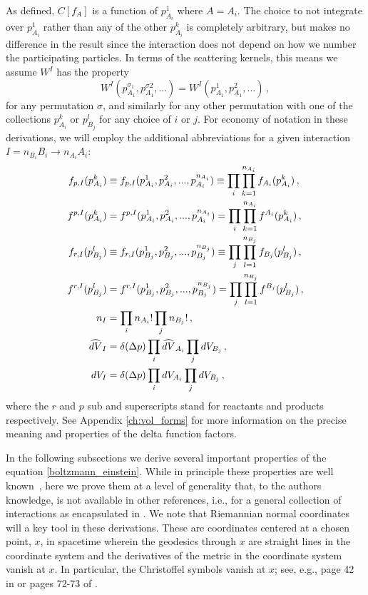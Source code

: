  As defined, $C[f_A]$ is a function of $p_{A_i}^1$ where $A=A_i$. The choice to not integrate over $p_{A_i}^1$ rather than any of the other $p_{A_i}^k$ is completely arbitrary, but makes no difference in the result since the interaction does not depend on how we number the participating particles. In terms of the scattering kernels, this means we assume $W^I$ has the property
\begin{equation}\label{reorder_property}
W^I(p_{A_1}^{\sigma_1},p^{\sigma 2}_{A_1},...)=W^I(p_{A_1}^1,p_{A_1}^2,...)\,,
\end{equation}
for any permutation $\sigma$, and similarly for any other permutation with one of the collections $p_{A_i}^k$ or $p_{B_j}^l$ for any choice of $i$ or $j$. For economy of notation in these derivations, we will employ the additional abbreviations for a given interaction  $I=n_{B_i}B_i\longrightarrow n_{A_i}A_i$:
\begin{align}
f_{p,I}(p^k_{A_i})&\equiv f_{p,I}(p^1_{A_i},p^2_{A_i},...,p^{n_{A_i}}_{A_i})\equiv \prod_i \prod_{k=1}^{n_{A_i}}f_{A_i}(p_{A_i}^k)\,,\\
f^{p,I}(p^k_{A_i})&=f^{p,I}(p^1_{A_i},p^2_{A_i},...,p^{n_{A_i}}_{A_i})=\prod_i \prod_{k=1}^{n_{A_i}}f^{A_i}(p_{A_i}^k)\,,\notag\\
f_{r,I}(p^l_{B_j})&\equiv f_{r,I}(p^1_{B_j},p^2_{B_j},...,p^{n_{B_j}}_{B_j})\equiv \prod_j \prod_{l=1}^{n_{B_j}}f_{B_j}(p_{B_j}^l)\,,\notag\\
f^{r,I}(p^l_{B_j})&=f^{r,I}(p^1_{B_j},p^2_{B_j},...,p^{n_{B_j}}_{B_j})=\prod_j \prod_{l=1}^{n_{B_j}}f^{B_j}(p_{B_j}^l)\,,\notag\\
n_I&=\prod_i n_{A_i}!\prod _j n_{B_j}!\,,\notag\\
\widehat{dV}_I&=\delta(\Delta p)\prod_i\widehat{dV}_{A_i}\prod_jdV_{B_j}\,,\notag\\
dV_I&=\delta(\Delta p)\prod_idV_{A_i}\prod_jdV_{B_j}\,,\notag
\end{align}
where the $r$ and $p$ sub and superscripts stand for reactants and products respectively.   See Appendix \ref{ch:vol_forms} for more information on the precise meaning and properties of the delta function factors.

In the following subsections we derive several important  properties of the equation \eqref{boltzmann_einstein}.  While in principle these properties are well known~\cite{andre,cercignani,bruhat,ehlers}, here we prove them at a level of generality that, to the authors knowledge, is not available in other references, i.e., for a general collection of interactions as encapsulated in .  We  note that Riemannian normal coordinates will a key tool   in these derivations.   These are coordinates centered at a chosen point, $x$, in spacetime wherein the geodesics through $x$ are straight lines in the coordinate system and the derivatives of the metric in the coordinate system vanish at $x$. In particular, the Christoffel symbols vanish at $x$; see, e.g., page 42 in \cite{wald2010general} or pages 72-73 of \cite{o1983semi}.  
